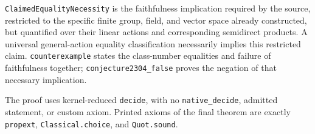 \documentclass[11pt]{article}
\begin{document}
\texttt{ClaimedEqualityNecessity} is the faithfulness implication
required by the source, restricted to the specific finite group, field,
and vector space already constructed, but quantified over their linear
actions and corresponding semidirect products.
A universal general-action equality classification necessarily implies
this restricted claim.
\texttt{counterexample} states the class-number equalities and failure
of faithfulness together; \texttt{conjecture2304\_false} proves the
negation of that necessary implication.

The proof uses kernel-reduced \texttt{decide}, with no
\texttt{native\_decide}, admitted statement, or custom axiom.
Printed axioms of the final theorem are exactly
\texttt{propext}, \texttt{Classical.choice}, and \texttt{Quot.sound}.
\end{document}
